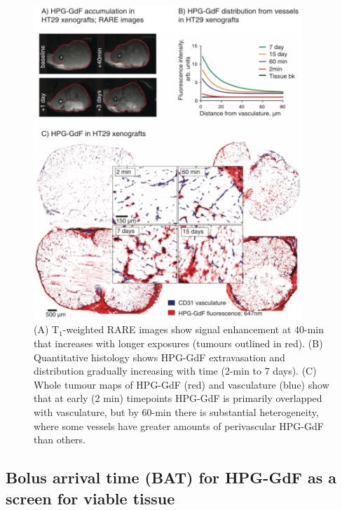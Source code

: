 \begin{figure}[htbp]
 \includegraphics[width=0.9\textwidth]{hpg/hpg-paper1-images/hpg_fig3-hpgdistribution.png}
 \caption{(A) T$_1$-weighted \acs{RARE} images show signal enhancement at 40-min that increases with longer exposures (tumours outlined in red). (B) Quantitative histology shows \acs{HPG-GdF} extravasation and distribution gradually increasing with time (2-min to 7 days). (C) Whole tumour maps of \acs{HPG-GdF} (red) and vasculature (blue) show that at early (2 min) timepoints \acs{HPG-GdF} is primarily overlapped with vasculature, but by 60-min there is substantial heterogeneity, where some vessels have greater amounts of perivascular \acs{HPG-GdF} than others.}
 \label{hpgpaper1:fig3}
\end{figure}

\subsection{Bolus arrival time (BAT) for \acs{HPG-GdF} as a screen for viable tissue}

